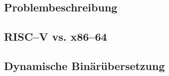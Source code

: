 \subsection{Problembeschreibung} %


\subsection{RISC--V vs. x86--64} %


\subsection{Dynamische Binärübersetzung} %

